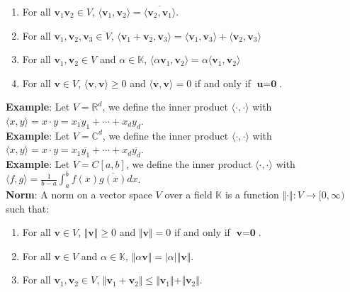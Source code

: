 \documentclass[12pt]{article}
\begin{document}
\begin{enumerate}[itemsep=0pt, parsep=0pt, partopsep=0pt, topsep=0pt]
\item For all $\textbf{v}_1 \textbf{v}_2 \in V$, $\langle \textbf{v}_1 , \textbf{v}_2 \rangle = \overline{\langle \textbf{v}_2 , \textbf{v}_1 \rangle}$.

\item For all $\textbf{v}_1, \textbf{v}_2, \textbf{v}_3 \in V$, $\langle \textbf{v}_1 + \textbf{v}_2 , \textbf{v}_3 \rangle = \langle \textbf{v}_1 , \textbf{v}_3 \rangle + \langle \textbf{v}_2 , \textbf{v}_3 \rangle$

\item For all $\textbf{v}_1, \textbf{v}_2 \in V$ and $\alpha \in \mathbb{K}$, $\langle \alpha \textbf{v}_1 , \textbf{v}_2 \rangle= \alpha \langle \textbf{v}_1 , \textbf{v}_2 \rangle$

\item For all $\textbf{v} \in V$, $\langle \textbf{v} , \textbf{v} \rangle \geq 0$ and $\langle \textbf{v} , \textbf{v} \rangle = 0$ if and only if $\textbf{u} = \textbf{0}$.  \\
\end{enumerate}

\noindent \textbf{Example}: Let $V= \mathbb{R}^d$, we define the inner product $\langle \cdot, \cdot \rangle$ with $\langle x, y \rangle = x\cdot y = x_1y_1 + \cdots + x_dy_d$. \\

\noindent \textbf{Example}: Let $V= \mathbb{C}^d$, we define the inner product $\langle \cdot, \cdot \rangle$ with $\langle x, y \rangle = x\cdot y = x_1\overline{y_1} + \cdots + x_d\overline{y_d}$. \\

\noindent \textbf{Example}: Let $V= C[a,b]$, we define the inner product $\langle \cdot, \cdot \rangle$ with $\langle f, g \rangle = \frac{1}{b-a} \int^b_a f(x)\overline{g(x)} dx$. \\

\noindent \textbf{Norm}: A norm on a vector space $V$ over a field $\mathbb{K}$ is a function $\Vert \cdot \Vert: V \rightarrow [0, \infty)$ such that:

\begin{enumerate}[itemsep=0pt, parsep=0pt, partopsep=0pt, topsep=0pt]
\item For all $\textbf{v}\in V$, $\Vert \textbf{v} \Vert \geq 0$ and $\Vert \textbf{v} \Vert = 0$ if and only if $\textbf{v}=\textbf{0}$.

\item For all $\textbf{v}\in V$ and $\alpha \in \mathbb{K}$, $\Vert \alpha \textbf{v} \Vert = \vert \alpha \vert \Vert \textbf{v} \Vert$.

\item For all $\textbf{v}_1,\textbf{v}_2 \in V$, $\Vert \textbf{v}_1 + \textbf{v}_2 \Vert \leq \Vert \textbf{v}_1 \Vert + \Vert \textbf{v}_2 \Vert$. \\
    \end{enumerate}
\end{document}
